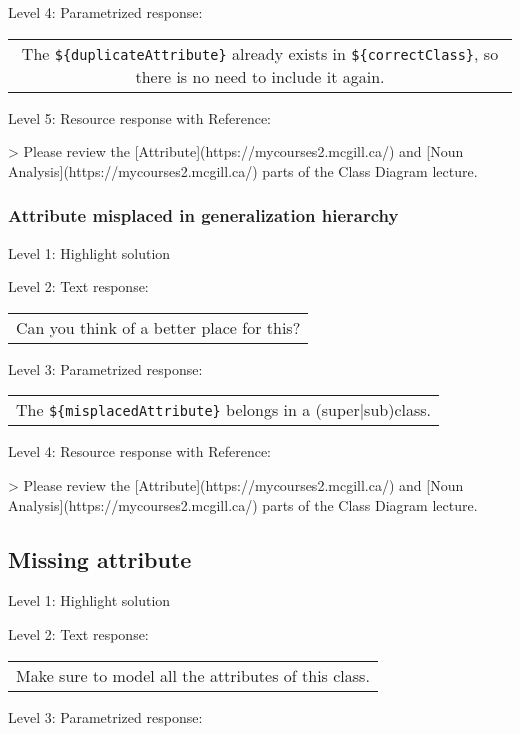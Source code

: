 \noindent Level 4: Parametrized response: \medskip

\begin{tabular}{|c}
The \verb|${duplicateAttribute}| already exists in \verb|${correctClass}|, so there is no need to include it again.
\end{tabular} \medskip

\noindent Level 5: Resource response with Reference:

> Please review the [Attribute](https://mycourses2.mcgill.ca/) and [Noun Analysis](https://mycourses2.mcgill.ca/) parts of the Class Diagram lecture.


\subsubsection{Attribute misplaced in generalization hierarchy}

\noindent Level 1: Highlight solution \medskip

\noindent Level 2: Text response: \medskip

\begin{tabular}{|c}
Can you think of a better place for this?
\end{tabular} \medskip

\noindent Level 3: Parametrized response: \medskip

\begin{tabular}{|c}
The \verb|${misplacedAttribute}| belongs in a (super|sub)class.
\end{tabular} \medskip

\noindent Level 4: Resource response with Reference:

> Please review the [Attribute](https://mycourses2.mcgill.ca/) and [Noun Analysis](https://mycourses2.mcgill.ca/) parts of the Class Diagram lecture.


\subsection{Missing attribute}

\noindent Level 1: Highlight solution \medskip

\noindent Level 2: Text response: \medskip

\begin{tabular}{|c}
Make sure to model all the attributes of this class.
\end{tabular} \medskip

\noindent Level 3: Parametrized response: \medskip


